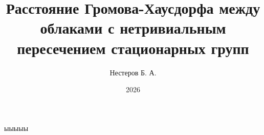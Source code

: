 \documentclass[12pt]{beamer}
\title[Расстояние Громова-Хаусдорфа]{Расстояние Громова-Хаусдорфа
  между облаками с нетривиальным
пересечением стационарных групп}
\author{Нестеров Б. А.}
\institute{607 группа}
\date{2026}
\begin{document}
\frame{\titlepage}
\begin{frame}
  ыыыыы
\end{frame}
\end{document}
